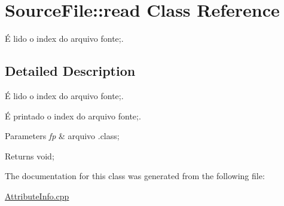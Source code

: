 \hypertarget{class_source_file_1_1read}{}\section{Source\+File\+:\+:read Class Reference}
\label{class_source_file_1_1read}


É lido o index do arquivo fonte;.  




\subsection{Detailed Description}
É lido o index do arquivo fonte;. 

É printado o index do arquivo fonte;.


\begin{DoxyParams}{Parameters}
{\em fp} & arquivo .class; \\
\hline
\end{DoxyParams}
\begin{DoxyReturn}{Returns}
void; 
\end{DoxyReturn}


The documentation for this class was generated from the following file\+:\begin{DoxyCompactItemize}
\item 
\hyperlink{_attribute_info_8cpp}{Attribute\+Info.\+cpp}\end{DoxyCompactItemize}
